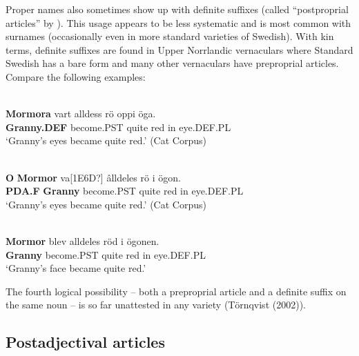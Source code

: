
Proper names also sometimes show up with definite suffixes (called “postproprial articles” by \citet[23]{Delsing2003a}). This usage appears to be less systematic and is most common with surnames (occasionally even in more standard varieties of Swedish). With kin terms, definite suffixes are found in Upper Norrlandic vernaculars where Standard Swedish has a bare form and many other vernaculars have preproprial articles. Compare the following examples:


\ea\label{}
\\
\gll \textbf{Mormora} vart  alldess  rö  oppi  öga.\\
\textbf{Granny.DEF} become.PST  quite  red  in  eye.DEF.PL\\
\glt ‘Granny’s eyes became quite red.’ (Cat Corpus)

\z

\ea\label{}
\\
\gll \textbf{O} \textbf{Mormor} va[1E6D?]  âlldeles  rö  i  ögon.\\
\textbf{PDA.F} \textbf{Granny} become.PST  quite  red  in  eye.DEF.PL\\
\glt ‘Granny’s eyes became quite red.’ (Cat Corpus)

\z

\ea\label{}
\\
\gll \textbf{Mormor} blev  alldeles  röd  i  ögonen.\\
\textbf{Granny} become.PST  quite  red  in  eye.DEF.PL\\
\glt ‘Granny’s face became quite red.’ 

\z

The fourth logical possibility – both a preproprial article and a definite suffix on the same noun – is so far unattested in any variety (Törnqvist (2002)). 


\subsection{ Postadjectival articles}

